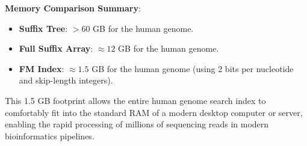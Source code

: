 \sta \textbf{Memory Comparison Summary}:
\begin{itemize}
    \item \textbf{Suffix Tree}: \( > 60 \) GB for the human genome.
    \item \textbf{Full Suffix Array}: \( \approx 12 \) GB for the human genome.
    \item \textbf{FM Index}: \( \approx 1.5 \) GB for the human genome (using 2 bits per nucleotide and skip-length integers).
\end{itemize}
This 1.5 GB footprint allows the entire human genome search index to comfortably fit into the standard RAM of a modern desktop computer or server, enabling the rapid processing of millions of sequencing reads in modern bioinformatics pipelines.

